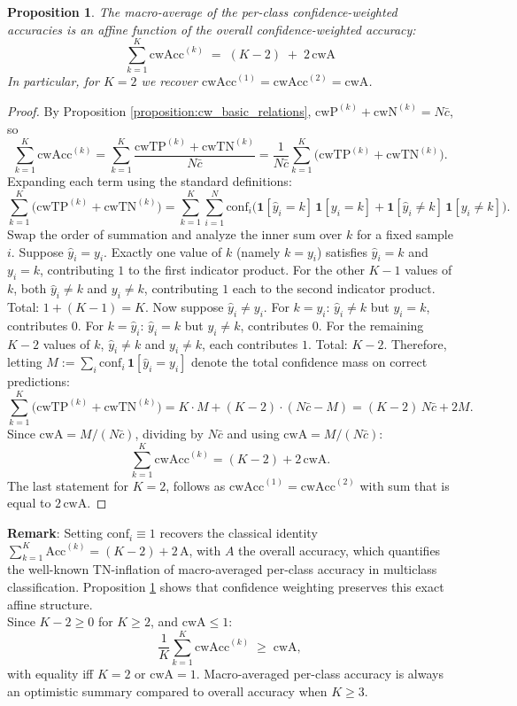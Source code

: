 \documentclass{article}
\theoremstyle{plain}
\newtheorem{theorem}{Proposition}
\theoremstyle{definition}
\theoremstyle{remark}
\begin{document}
\begin{theorem} \label{theorem:cwA_macro}
The macro-average of the per-class confidence-weighted accuracies is an
affine function of the overall confidence-weighted accuracy:
\[
\sum_{k=1}^K \text{cwAcc}^{(k)} \;=\; (K-2) \;+\; 2\,\text{cwA}
\]
In particular, for $K=2$ we recover $\text{cwAcc}^{(1)} = \text{cwAcc}^{(2)} = \text{cwA}$.
\end{theorem}
\begin{proof}
By Proposition \ref{proposition:cw_basic_relations}, $\text{cwP}^{(k)} + \text{cwN}^{(k)} = N\bar c$, so \[
\sum_{k=1}^K \text{cwAcc}^{(k)} = \sum_{k=1}^K \frac{\text{cwTP}^{(k)} + \text{cwTN}^{(k)}}{N\bar c} = \frac{1}{N\bar c}\sum_{k=1}^K \big(\text{cwTP}^{(k)} + \text{cwTN}^{(k)}\big). 
\] Expanding each term using the standard definitions: \[
\sum_{k=1}^K\!\big(\text{cwTP}^{(k)} + \text{cwTN}^{(k)}\big) = \sum_{k=1}^K\sum_{i=1}^N \text{conf}_i\Big(\mathbf{1}[\hat y_i=k]\,\mathbf{1}[y_i=k] + \mathbf{1}[\hat y_i\neq k]\,\mathbf{1}[y_i\neq k]\Big). 
\] Swap the order of summation and analyze the inner sum over $k$ for a fixed sample $i$.  Suppose $\hat y_i = y_i$. Exactly one value of $k$ (namely $k = y_i$) satisfies $\hat y_i = k$ and $y_i = k$, contributing $1$ to the first indicator product. For the other $K-1$ values of $k$, both $\hat y_i \neq k$ and $y_i \neq k$, contributing $1$ each to the second indicator product. Total: $1 + (K-1) = K$. Now suppose $\hat y_i \neq y_i$. For $k = y_i$: $\hat y_i \neq k$ but $y_i = k$, contributes $0$. For $k = \hat y_i$: $\hat y_i = k$ but $y_i \neq k$, contributes $0$. For the remaining $K-2$ values of $k$, $\hat y_i \neq k$ and $y_i \neq k$, each contributes $1$. Total: $K-2$.
Therefore, letting $M := \sum_i \text{conf}_i\,\mathbf{1}[\hat y_i = y_i]$ denote the total confidence mass on correct predictions: \[
\sum_{k=1}^K\!\big(\text{cwTP}^{(k)} + \text{cwTN}^{(k)}\big) = K\cdot M + (K-2)\cdot(N\bar c - M) = (K-2)\,N\bar c + 2M. 
\] Since $\text{cwA} = M / (N\bar c)$, dividing by $N\bar c$ and using $\text{cwA} = M/(N\bar c)$: \[
\sum_{k=1}^K \text{cwAcc}^{(k)} = (K-2) + 2\,\text{cwA}. \]
The last statement for $K=2$, follows as $\text{cwAcc}^{(1)} = \text{cwAcc}^{(2)}$ with sum that is equal to $2\,\text{cwA}$. 
\end{proof}
\smallskip

{\bf{Remark}}:  Setting $\text{conf}_i \equiv 1$ recovers the classical identity $\sum_{k=1}^K \text{Acc}^{(k)} = (K-2) + 2\,\text{A}$, with $A$ the overall accuracy, which quantifies the well-known TN-inflation of macro-averaged per-class accuracy in multiclass classification. Proposition \ref{theorem:cwA_macro} shows that confidence weighting preserves this exact affine structure. \\
Since $K-2 \geq 0$ for $K \geq 2$, and $\text{cwA} \leq 1$: \[
\frac{1}{K}\sum_{k=1}^K \text{cwAcc}^{(k)} \;\geq\; \text{cwA}, 
\] with equality iff $K=2$ or $\text{cwA}=1$. Macro-averaged per-class accuracy is always an optimistic summary compared to overall accuracy when $K\geq 3$.  
\bigskip
\end{document}
